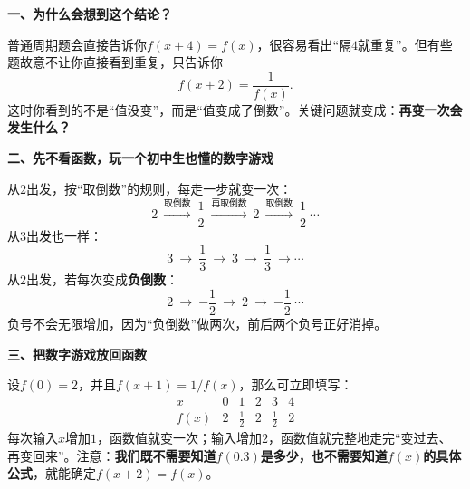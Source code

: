 \clearpage
\begin{explanationbox}
\textbf{\textcolor{CExplanation}{一、为什么会想到这个结论？}}



普通周期题会直接告诉你$f(x+4)=f(x)$，很容易看出“隔$4$就重复”。但有些题故意不让你直接看到重复，只告诉你
\[
 f(x+2)=\frac{1}{f(x)}.
\]
这时你看到的不是“值没变”，而是“值变成了倒数”。关键问题就变成：\textbf{再变一次会发生什么？}

\medskip

\end{explanationbox}
\clearpage
\begin{explanationbox}
\textbf{\textcolor{CExplanation}{二、先不看函数，玩一个初中生也懂的数字游戏}}



从$2$出发，按“取倒数”的规则，每走一步就变一次：
\[
\boxed{2}\ \xrightarrow{\text{取倒数}}\
\boxed{\frac12}\ \xrightarrow{\text{再取倒数}}\
\boxed{2}\ \xrightarrow{\text{取倒数}}\
\boxed{\frac12}\ \cdots
\]
从$3$出发也一样：
\[
 3\ \longrightarrow\ \frac13\ \longrightarrow\ 3\ \longrightarrow\ \frac13\ \longrightarrow\cdots
\]
从$2$出发，若每次变成\textbf{负倒数}：
\[
\boxed{2}\ \longrightarrow\
\boxed{-\frac12}\ \longrightarrow\
\boxed{2}\ \longrightarrow\
\boxed{-\frac12}\ \cdots
\]
负号不会无限增加，因为“负倒数”做两次，前后两个负号正好消掉。

\medskip

\end{explanationbox}
\clearpage
\begin{explanationbox}
\textbf{\textcolor{CExplanation}{三、把数字游戏放回函数}}



设$f(0)=2$，并且$f(x+1)=1/f(x)$，那么可立即填写：
\[
\begin{array}{c|ccccc}
 x &0&1&2&3&4\\ \hline
 f(x)&2&\frac12&2&\frac12&2
\end{array}
\]
每次输入$x$增加$1$，函数值就变一次；输入增加$2$，函数值就完整地走完“变过去、再变回来”。注意：\textbf{我们既不需要知道$f(0.3)$是多少，也不需要知道$f(x)$的具体公式}，就能确定$f(x+2)=f(x)$。

\medskip

\end{explanationbox}
\clearpage
